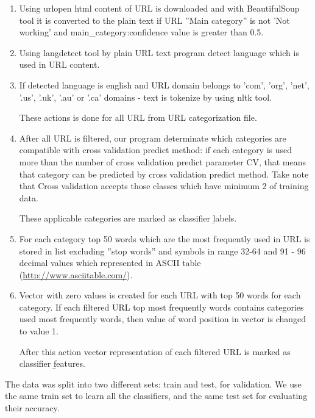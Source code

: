 \documentclass{article} %
\begin{document}
 \begin{enumerate}
 	
	 	\item Using urlopen \cite{url_open} html content of URL is downloaded and with BeautifulSoup tool it is converted to the plain text if URL ''Main category'' is not 'Not working' and main\_category:confidence value is greater than 0.5.
 	\item Using langdetect tool by plain URL text program detect language which is used in URL content.
 	\item If detected language is english and URL domain belongs to 'com', 'org', 'net', '.us', '.uk', '.au' or '.ca' domains - text is tokenize by using nltk tool. 
 	
 	These actions is done for all URL from URL categorization file.
 	
 	\item After all URL is filtered, our program determinate which categories are compatible with cross validation predict method: if each category is used more than the number of cross validation predict parameter CV, that means that category can be predicted by cross validation predict method. Take note that Cross validation accepts those classes which have minimum 2 of training data.
 	
 	These applicable categories are marked as classifier \b{labels}.
 	
 	\item For each category top 50 words which are the most frequently used in URL is stored in list excluding ''stop words'' and symbols in range 32-64 and 91 - 96 decimal values which represented in ASCII table (\href{http://www.asciitable.com/}{http://www.asciitable.com/}).
 	
 	\item Vector with zero values is created for each URL with top 50 words for each category. If each filtered URL top most frequently words contains categories used most frequently words, then value of word position in vector is changed to value 1.
 	
 	After this action vector representation of each filtered URL is marked as classifier \b{features}.
 	
 \end{enumerate} 
	
  The data was split into two different sets: train and test, for validation. We use the same train set to learn all the classifiers, and the same test set for evaluating their accuracy.
\end{document}
